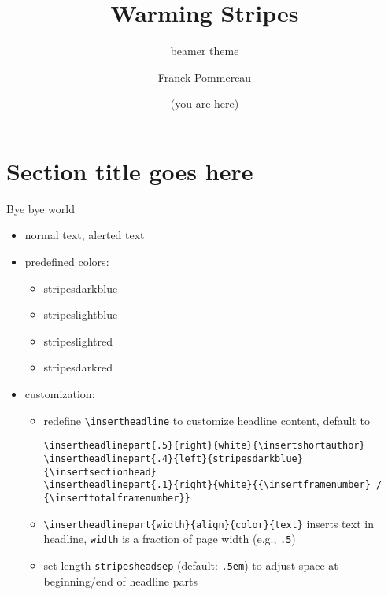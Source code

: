 \documentclass{beamer}
\begin{document}
\title{Warming Stripes}
\subtitle{beamer theme}
\author{Franck Pommereau}
\date{\color{stripesdarkred}(you are here)}

\maketitle

\section{Section title goes here}

\begin{frame}[fragile]{Bye bye world}
  \begin{itemize}
    \item normal text, \alert{alerted text}
    \item predefined colors:
    \begin{itemize}
      \item {\color{stripesdarkblue}stripesdarkblue}
      \item {\color{stripeslightblue}stripeslightblue}
      \item {\color{stripeslightred}stripeslightred}
      \item {\color{stripesdarkred}stripesdarkred}
    \end{itemize}
    \item customization:
    \begin{itemize}
      \item redefine \Verb|\insertheadline| to customize headline content, default to
        \begin{Verbatim}[fontsize=\relsize{-2}]
\insertheadlinepart{.5}{right}{white}{\insertshortauthor}
\insertheadlinepart{.4}{left}{stripesdarkblue}{\insertsectionhead}
\insertheadlinepart{.1}{right}{white}{{\insertframenumber} / {\inserttotalframenumber}}
        \end{Verbatim}
      \item \Verb|\insertheadlinepart{width}{align}{color}{text}|
        inserts text in headline, \Verb|width| is a fraction of page width (e.g., \Verb|.5|)
      \item set length \Verb|stripesheadsep| (default: \texttt{.5em})
        to adjust space at beginning/end of headline parts
    \end{itemize}
  \end{itemize}
\end{frame}
\end{document}
